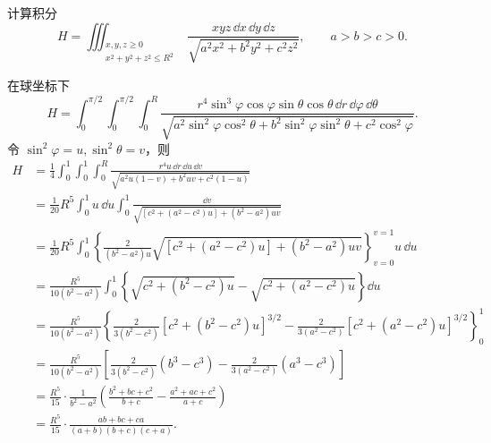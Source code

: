 \begin{xexample}[22.3.3]
计算积分
\[
  H=\iiint_{\substack{x,y,z\ge0\\x^2+y^2+z^2\le R^2}}
  \frac{xyz\,\dd x\,\dd y\,\dd z}{\sqrt{a^2x^2+b^2y^2+c^2z^2}},
  \qquad a>b>c>0.
\]
\end{xexample}
\begin{xsolution}
在球坐标下
\[
  H=\int_0^{\pi/2}\int_0^{\pi/2}\int_0^R
  \frac{r^4\sin^3\varphi\cos\varphi\sin\theta\cos\theta\,\dd r\,\dd\varphi\,\dd\theta}
  {\sqrt{a^2\sin^2\varphi\cos^2\theta+b^2\sin^2\varphi\sin^2\theta+c^2\cos^2\varphi}}.
\]
令 $\sin^2\varphi=u,\sin^2\theta=v$，则
\begin{align*}
  H&=\frac14\int_0^1\int_0^1\int_0^R
  \frac{r^4u\,\dd r\,\dd u\,\dd v}
  {\sqrt{a^2u(1-v)+b^2uv+c^2(1-u)}}\\
  &=\frac1{20}R^5\int_0^1u\,\dd u\int_0^1
  \frac{\dd v}{\sqrt{[c^2+(a^2-c^2)u]+(b^2-a^2)uv}}\\
  &=\frac1{20}R^5\int_0^1\left\{
  \frac{2}{(b^2-a^2)u}\sqrt{[c^2+(a^2-c^2)u]+(b^2-a^2)uv}
  \right\}_{v=0}^{v=1}u\,\dd u\\
  &=\frac{R^5}{10(b^2-a^2)}\int_0^1
  \left\{\sqrt{c^2+(b^2-c^2)u}-\sqrt{c^2+(a^2-c^2)u}\right\}\dd u\\
  &=\frac{R^5}{10(b^2-a^2)}\left\{
  \frac{2}{3(b^2-c^2)}[c^2+(b^2-c^2)u]^{3/2}
  -\frac{2}{3(a^2-c^2)}[c^2+(a^2-c^2)u]^{3/2}
  \right\}_0^1\\
  &=\frac{R^5}{10(b^2-a^2)}\left[
  \frac{2}{3(b^2-c^2)}(b^3-c^3)
  -\frac{2}{3(a^2-c^2)}(a^3-c^3)\right]\\
  &=\frac{R^5}{15}\cdot\frac1{b^2-a^2}
  \left(\frac{b^2+bc+c^2}{b+c}-\frac{a^2+ac+c^2}{a+c}\right)\\
  &=\frac{R^5}{15}\cdot\frac{ab+bc+ca}{(a+b)(b+c)(c+a)}.
\end{align*}
\end{xsolution}

